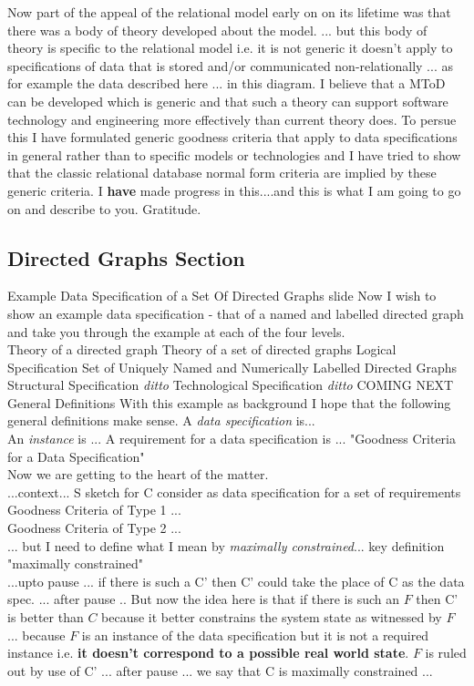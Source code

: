 \documentclass[12pt,a4paper]{article}
\theoremstyle{remark}
\begin{document}
\note 
Now part of the appeal of the relational model early on on its lifetime was that there was   a body of theory developed about the model. 
... but this body of theory is specific to the relational model i.e. it is not generic it doesn't apply to specifications of data that is stored and/or communicated non-relationally ... as for example the data described here ... in this diagram.
\note
I believe that a MToD can be developed which is generic and that such a theory can support software technology and engineering more effectively than current theory does. To persue this I have formulated generic goodness criteria that apply to data specifications in general rather than to specific models or technologies and I have tried to show that the classic relational database normal form criteria are implied by these generic criteria. 
I \textbf{have} made progress in this....and  this is what I am going  to go on and describe to you. Gratitude.


\subsection*{Directed Graphs Section}
\note Example Data Specification of a Set Of Directed Graphs slide
Now I wish to show an example data specification - that of a named and labelled directed graph and take you through the example at each of the four levels.\\
\note Theory of a directed graph
\note Theory of a set of directed graphs
\note Logical Specification Set of Uniquely Named and Numerically Labelled Directed Graphs
\note Structural Specification \textit{ditto}
\note Technological Specification \textit{ditto}
\note COMING NEXT General Definitions
With this example as background I hope that the following general definitions make sense.
\note A \textit{data specification} is... \\
 An \textit{instance} is ...
 \note A requirement for a data specification is ...
 \note "Goodness Criteria for a Data Specification"\\
 Now we are getting to the heart of the matter. \\
 ...context... S sketch for C consider as data specification for a set of requirements\\
 Goodness Criteria of Type 1 ...\\
 Goodness Criteria of Type 2 ... \\
... but I need to define what I mean by \textit{maximally constrained}...
\note key definition "maximally constrained"\\
...upto pause ... if there is such a C' then C' could take the place of C as the data spec.
... after pause ..
But now the idea here is that if there is such an $F$ then C' is better than $C$
because it better constrains the system state as witnessed by $F$ ... because $F$ is an  instance of the data specification but it is not a required instance 
i.e. \textbf{it doesn't correspond to a possible real world state}.  
$F$ is ruled out by use of C'
... after pause ... we say that C is maximally constrained ...
\end{document}
